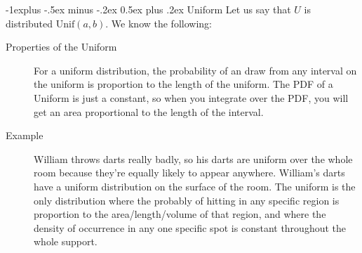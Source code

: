 \documentclass[10pt,landscape]{article}
\makeatletter
\newcommand{\Unif}{\textrm{Unif}}
\renewcommand{\subsection}{\@startsection{subsection}{2}{0mm}%
                                {-1explus -.5ex minus -.2ex}%
                                {0.5ex plus .2ex}%
                                {\normalfont\normalsize\bfseries}}
\makeatother
\begin{document}
\begin{multicols}{3}
\subsection{Uniform} Let us say that $U$ is distributed $\Unif(a, b)$. We know the following:
\begin{description}
    \item[Properties of the Uniform] For a uniform distribution, the probability of an draw from any interval on the uniform is proportion to the length of the uniform. The PDF of a Uniform is just a constant, so when you integrate over the PDF, you will get an area proportional to the length of the interval.
    \item[Example] William throws darts really badly, so his darts are uniform over the whole room because they're equally likely to appear anywhere. William's darts have a uniform distribution on the surface of the room. The uniform is the only distribution where the probably of hitting in any specific region is proportion to the area/length/volume of that region, and where the density of occurrence in any one specific spot is constant throughout the whole support.



\end{description}
\end{multicols}
\end{document}
